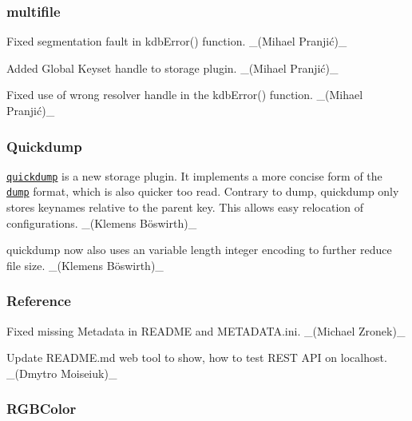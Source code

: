 \subsubsection*{multifile}


\begin{DoxyItemize}
\item Fixed segmentation fault in {\ttfamily kdb\+Error()} function. \+\_\+(Mihael Pranjić)\+\_\+
\item Added Global Keyset handle to storage plugin. \+\_\+(Mihael Pranjić)\+\_\+
\item Fixed use of wrong resolver handle in the {\ttfamily kdb\+Error()} function. \+\_\+(Mihael Pranjić)\+\_\+
\end{DoxyItemize}

\subsubsection*{Quickdump}


\begin{DoxyItemize}
\item \href{https://www.libelektra.org/plugins/quickdump}{\tt quickdump} is a new storage plugin. It implements a more concise form of the \href{https://www.libelektra.org/plugins/dump}{\tt dump} format, which is also quicker too read. Contrary to dump, quickdump only stores keynames relative to the parent key. This allows easy relocation of configurations. \+\_\+(Klemens Böswirth)\+\_\+
\item quickdump now also uses an variable length integer encoding to further reduce file size. \+\_\+(Klemens Böswirth)\+\_\+
\end{DoxyItemize}

\subsubsection*{Reference}


\begin{DoxyItemize}
\item Fixed missing Metadata in R\+E\+A\+D\+ME and M\+E\+T\+A\+D\+A\+T\+A.\+ini. \+\_\+(\+Michael Zronek)\+\_\+
\item Update R\+E\+A\+D\+M\+E.\+md web tool to show, how to test R\+E\+ST A\+PI on localhost. \+\_\+(\+Dmytro Moiseiuk)\+\_\+
\end{DoxyItemize}

\subsubsection*{R\+G\+B\+Color}


